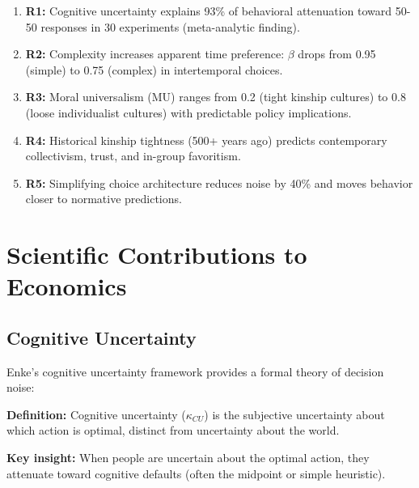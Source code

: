 \begin{enumerate}
    \item \textbf{R1:} Cognitive uncertainty explains 93\% of behavioral attenuation
    toward 50-50 responses in 30 experiments (meta-analytic finding).

    \item \textbf{R2:} Complexity increases apparent time preference: $\beta$ drops
    from 0.95 (simple) to 0.75 (complex) in intertemporal choices.

    \item \textbf{R3:} Moral universalism (MU) ranges from 0.2 (tight kinship cultures)
    to 0.8 (loose individualist cultures) with predictable policy implications.

    \item \textbf{R4:} Historical kinship tightness (500+ years ago) predicts
    contemporary collectivism, trust, and in-group favoritism.

    \item \textbf{R5:} Simplifying choice architecture reduces noise by 40\% and
    moves behavior closer to normative predictions.
\end{enumerate}


\section{Scientific Contributions to Economics}
\label{sec:enk-economics}

\subsection{Cognitive Uncertainty}
\label{sec:enk-cu}

Enke's cognitive uncertainty framework \citep{enke2020cognitive, enke2023complexity}
provides a formal theory of decision noise:

\textbf{Definition:} Cognitive uncertainty ($\kappa_{CU}$) is the subjective
uncertainty about which action is optimal, distinct from uncertainty about
the world.

\textbf{Key insight:} When people are uncertain about the optimal action,
they attenuate toward cognitive defaults (often the midpoint or simple heuristic).

